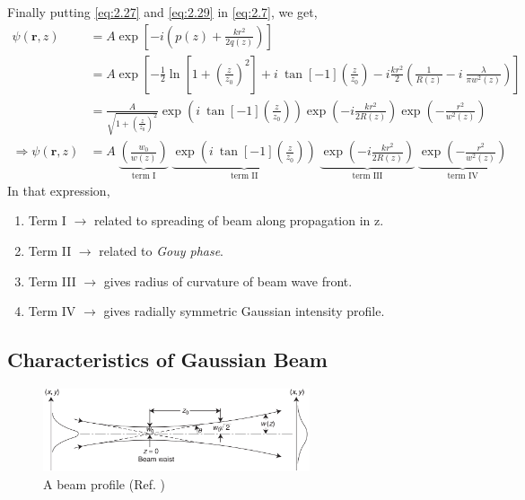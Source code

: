 \documentclass[11pt,a4paper]{article}
\numberwithin{equation}{section}
\begin{document}
Finally putting \ref{eq:2.27} and \ref{eq:2.29} in \ref{eq:2.7}, we get, \cite{kogelnik 66}\cite{cornell}
\begin{align}
	\psi(\boldsymbol{r},z)&= A\exp\left[-i\left(p(z) + \frac{kr^2}{2q(z)}\right)\right]\nonumber\\
	&= A\exp\left[- \frac{1}{2}\ln\left[1+ \left(\frac{z}{z_0}\right)^2\right]+i\: \tan[-1](\frac{z}{z_0}) -i \frac{kr^2}{2}\left(\frac{1}{R(z)} - i\: \frac{\lambda}{\pi w^2(z)}\right) \right]\nonumber\\
	&=\frac{A}{\sqrt{1+ \left(\frac{z}{z_0}\right)^2}} \exp(i\:\tan[-1](\frac{z}{z_0})) \exp(-i\frac{kr^2}{2R(z)}) \exp(-\frac{r^2}{w^2(z)}) \nonumber\\
	\Rightarrow \psi(\boldsymbol{r},z)&=A\; 
	\underbrace{\left(\frac{w_0}{w(z)}\right)}_{\text{term I}}\;
	\underbrace{\exp(i{\:}\tan[-1](\frac{z}{z_0}))}_{\text{term II}}\; \underbrace{\exp(-i\frac{kr^2}{2R(z)})}_{\text{term III}}\;
	\underbrace{\exp(-\frac{r^2}{w^2(z)})}_{\text{term IV}} \label{eq:2.30}
\end{align} 
In that expression,
\begin{enumerate}
	\item Term I $\longrightarrow$ related to spreading of beam along propagation in z.
	\item Term II $\longrightarrow$ related to \textit{Gouy phase}.
	\item Term III $\longrightarrow$ gives radius of curvature of beam wave front.
	\item Term IV $\longrightarrow$ gives radially symmetric Gaussian intensity profile.
	
\end{enumerate}

\subsection{Characteristics of Gaussian Beam }
\begin{figure}[H]
	\centering
	\includegraphics[width=0.7\textwidth]{beam.png}
	\caption{A beam profile (Ref. \cite{milonni})}
	\label{fig:beam}
\end{figure}
\end{document}

